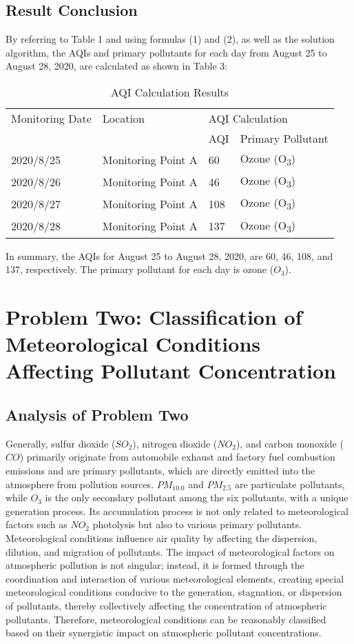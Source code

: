 \documentclass[12pt]{article}
\begin{document}
\subsection{Result Conclusion}

By referring to Table 1 and using formulas (1) and (2), as well as the solution algorithm, the AQIs and primary pollutants for each day from August 25 to August 28, 2020, are calculated as shown in Table 3:
\begin{table}[h!]
	\centering
	\caption{ AQI Calculation Results}
	\begin{tabular}{llll}
		\hline
		Monitoring Date & Location & \multicolumn{2}{l}{AQI Calculation} \\
		\cline{3-4}
		& & AQI & Primary Pollutant \\
		\hline
		2020/8/25 & Monitoring Point A & 60 & Ozone (O\textsubscript{3}) \\
		2020/8/26 & Monitoring Point A & 46 & Ozone (O\textsubscript{3}) \\
		2020/8/27 & Monitoring Point A & 108 & Ozone (O\textsubscript{3}) \\
		2020/8/28 & Monitoring Point A & 137 & Ozone (O\textsubscript{3}) \\
		\hline
	\end{tabular}
	\label{tab5}
\end{table}

In summary, the AQIs for August 25 to August 28, 2020, are 60, 46, 108, and 137, respectively. The primary pollutant for each day is ozone ($O_3$).

\section{Problem Two: Classification of Meteorological Conditions Affecting Pollutant Concentration}
\subsection{Analysis of Problem Two}

Generally, sulfur dioxide ($SO_2$), nitrogen dioxide ($NO_2$), and carbon monoxide ($CO$) primarily originate from automobile exhaust and factory fuel combustion emissions and are primary pollutants, which are directly emitted into the atmosphere from pollution sources. $PM_{10.0}$ and $PM_{2.5}$ are particulate pollutants, while $O_3$ is the only secondary pollutant among the six pollutants, with a unique generation process. Its accumulation process is not only related to meteorological factors such as $NO_2$ photolysis but also to various primary pollutants. Meteorological conditions influence air quality by affecting the dispersion, dilution, and migration of pollutants. The impact of meteorological factors on atmospheric pollution is not singular; instead, it is formed through the coordination and interaction of various meteorological elements, creating special meteorological conditions conducive to the generation, stagnation, or dispersion of pollutants, thereby collectively affecting the concentration of atmospheric pollutants. Therefore, meteorological conditions can be reasonably classified based on their synergistic impact on atmospheric pollutant concentrations.
\end{document}
